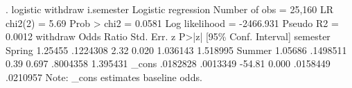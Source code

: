 . logistic withdraw i.semester
{\smallskip}
Logistic regression                             Number of obs     =     25,160
                                                LR chi2(2)        =       5.69
                                                Prob > chi2       =     0.0581
Log likelihood =  -2466.931                     Pseudo R2         =     0.0012
{\smallskip}
    withdraw {\VBAR} Odds Ratio   Std. Err.      z    P>|z|     [95\% Conf. Interval]
    semester {\VBAR}
     Spring  {\VBAR}    1.25455   .1224308     2.32   0.020     1.036143    1.518995
     Summer  {\VBAR}    1.05686   .1498511     0.39   0.697     .8004358    1.395431
             {\VBAR}
       _cons {\VBAR}   .0182828   .0013349   -54.81   0.000     .0158449    .0210957
Note: _cons estimates baseline odds.
{\smallskip}
